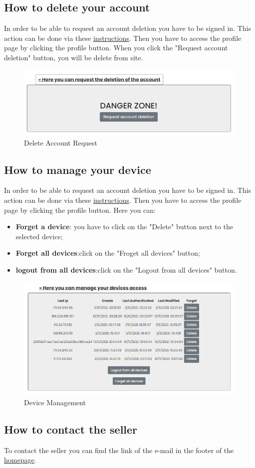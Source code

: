 \subsection{How to delete your account} \label{_delete}
In order to be able to request an account deletion you have to be signed in. This action can be done via these \hyperref[_signin]{instructions}.
Then you have to access the profile page by clicking the profile button.
When you click the "Request account deletion" button, you will be delete from site.
\begin{figure}[H]
    \centering
    \includegraphics[width=30em]{res/images/cliente/delete.png}
    \caption{Delete Account Request}
\end{figure}

\subsection{How to manage your device} \label{_device}
In order to be able to request an account deletion you have to be signed in. This action can be done via these \hyperref[_signin]{instructions}.
Then you have to access the profile page by clicking the profile button.
Here you can:
\begin{itemize} 
    \item \textbf{Forget a device}: you have to click on the "Delete" button next to the selected device; 
    \item \textbf{Forget all devices}:click on the "Froget all devices" button;
    \item \textbf{logout from all devices}:click on the "Logout from all devices" button.
\end{itemize}

\begin{figure}[H]
    \centering
    \includegraphics[width=30em]{res/images/cliente/device.png}
    \caption{Device Management}
\end{figure}


\subsection{How to contact the seller} \label{_contacts}
To contact the seller you can find the link of the e-mail in the footer of the \hyperref[_homepage]{homepage}.

